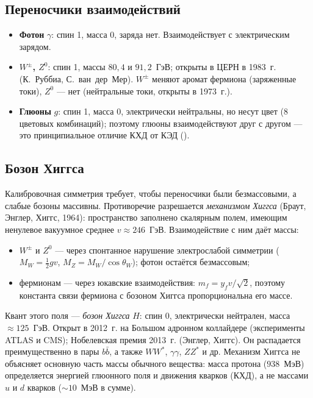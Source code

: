 \subsection{Переносчики взаимодействий}

\begin{itemize}
 \item \textbf{Фотон} $\gamma$: спин 1, масса 0, заряда нет. Взаимодействует с электрическим зарядом.
 \item \textbf{$W^\pm$, $Z^0$}: спин 1, массы $80{,}4$ и $91{,}2$~ГэВ; открыты в ЦЕРН в 1983~г. (К.~Руббиа, С.~ван~дер~Мер).
       $W^\pm$ меняют аромат фермиона (заряженные токи), $Z^0$ — нет (нейтральные токи, открыты в 1973~г.).
 \item \textbf{Глюоны} $g$: спин 1, масса 0, электрически нейтральны, но несут цвет (8 цветовых комбинаций);
       поэтому глюоны взаимодействуют друг с другом — это принципиальное отличие КХД от КЭД ().
\end{itemize}

\subsection{Бозон Хиггса}

Калибровочная симметрия требует, чтобы переносчики были безмассовыми, а слабые бозоны массивны.
Противоречие разрешается \emph{механизмом Хиггса} (Браут, Энглер, Хиггс, 1964): пространство заполнено
скалярным полем, имеющим ненулевое вакуумное среднее $v\approx246$~ГэВ. Взаимодействие с ним даёт массы:
\begin{itemize}
 \item $W^\pm$ и $Z^0$ — через спонтанное нарушение электрослабой симметрии ($M_W=\frac12gv$, $M_Z=M_W/\cos\theta_W$);
       фотон остаётся безмассовым;
 \item фермионам — через юкавские взаимодействия: $m_f=y_fv/\sqrt2$, поэтому константа связи фермиона с
       бозоном Хиггса пропорциональна его массе.
\end{itemize}
Квант этого поля — \emph{бозон Хиггса} $H$: спин 0, электрически нейтрален, масса $\approx125$~ГэВ. Открыт в
2012~г. на Большом адронном коллайдере (эксперименты ATLAS и CMS); Нобелевская премия 2013~г.
(Энглер, Хиггс). Он распадается преимущественно в пары $b\bar b$, а также $WW^*$, $\gamma\gamma$, $ZZ^*$ и др.
Механизм Хиггса не объясняет основную часть массы обычного вещества: масса протона ($938$~МэВ)
определяется энергией глюонного поля и движения кварков (КХД), а не массами $u$ и $d$ кварков ($\sim10$~МэВ в сумме).

